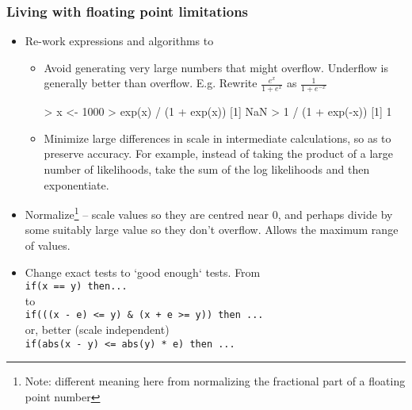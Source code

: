 \documentclass[11pt,a4paper]{article}
\begin{document}
\begin{frame}[fragile]
	\frametitle{Living with floating point limitations}

	\begin{itemize}
	  \item Re-work expressions and algorithms to
    \begin{itemize}
      \item<2-> Avoid generating very large numbers that might overflow.  Underflow is generally better than overflow.  E.g. Rewrite $\frac{e^x}{1+e^x}$ as $\frac{1}{1+e^{-x}}$
	\begin{semiverbatim}
	> x <- 1000
	> exp(x) / (1 + exp(x))
	[1] NaN
	> 1 / (1 + exp(-x))
	[1] 1\end{semiverbatim}
	   \item <3->Minimize large differences in scale in intermediate calculations, so as to preserve accuracy.  For example, instead of taking the product of a large number of likelihoods, take the sum of the log likelihoods and then exponentiate.
	 \end{itemize}
  \end{itemize}
\end{frame}
\begin{frame}[fragile]
  \begin{itemize}	
     \item Normalize\footnote{Note: different meaning here from normalizing the fractional part of a floating point number} -- scale values so they are centred near 0, and perhaps divide by some suitably large value so they don't overflow.  Allows the maximum range of values.
	    \item <2->Change exact tests to `good enough` tests.  From\\
	\texttt{if(x == y) then...}\\
	to\\
	\texttt{if(((x - e) <= y) \& (x + e >= y)) then ...}\\
	or, better (scale independent)\\
	\texttt{if(abs(x - y) <= abs(y) * e) then ...}

  \end{itemize}
\end{frame}
\end{document}
